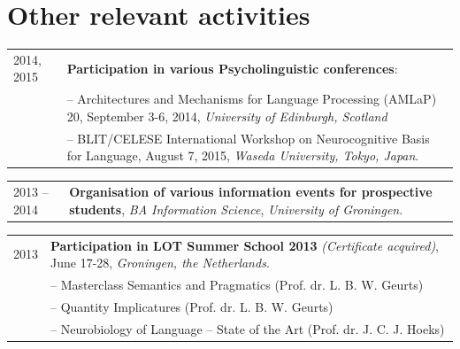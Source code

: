 \documentclass[a4paper,10pt]{article}
\def\leftcolwidth{.12\textwidth}
\def\tablevspace{10pt}
\begin{document}

\section*{Other relevant activities}

\begin{tabularx}{\textwidth}{ p{\leftcolwidth} X }
  2014, 2015 
       & \textbf{Participation in various Psycholinguistic conferences}:\\
       & -- Architectures and Mechanisms for Language Processing (AMLaP) 20, 
        September 3-6, 2014, \textit{University of Edinburgh, Scotland}\\
       & -- BLIT/CELESE International Workshop on Neurocognitive Basis for Language, 
        August 7, 2015, \textit{Waseda University, Tokyo, Japan}.\\
\end{tabularx}

\vspace{\tablevspace}

\noindent
\begin{tabularx}{\textwidth}{ p{\leftcolwidth} X }
  2013 -- 2014
  & \textbf{Organisation of various information events for prospective students}, 
  \textit{BA Information Science}, \textit{University of Groningen}.\\
\end{tabularx}

\vspace{\tablevspace}

\noindent
\begin{tabularx}{\textwidth}{ p{\leftcolwidth} X }
  2013 & \textbf{Participation in LOT Summer School 2013} \textit{(Certificate acquired)}, June 17-28,
         \textit{Groningen, the Netherlands}.\\
       & -- {Masterclass Semantics and Pragmatics} (Prof. dr. L. B. W. Geurts)\\
       & -- {Quantity Implicatures} (Prof. dr. L. B. W. Geurts)\\
       & -- {Neurobiology of Language -- State of the Art} (Prof. dr. J. C. J. Hoeks)\\
\end{tabularx}
\end{document}
